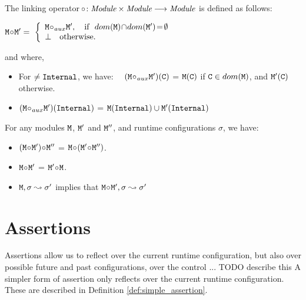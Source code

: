 \begin{definition}

The linking operator $\!\circ\!: {\mbox{\tt{{\it Module}}}} \times  {\mbox{\tt{{\it Module}}}} \longrightarrow {\mbox{\tt{{\it Module}}}}$ is defined as follows:

$
\M \link \M{'}  =\ \left\{
\begin{array}{l}
                        \M \link_{aux} \M{'},\ \ \   \hbox{if}\  \ dom(\M)\!\cap\!dom(\M')\!=\!\emptyset\\
\bot  \ \ \ \mbox{otherwise.}
\end{array}
                    \right.$
                    
and where,                  
\begin{itemize}
     \item 
   For $\neq{\mbox{\tt{Internal}}}$, we have: \ \
   $({\mbox{\tt{M}}} \!\circ\!_{aux} {\mbox{\tt{M}}}')({\mbox{\tt{C}}})$ = ${\mbox{\tt{M}}}({\mbox{\tt{C}}})$  if  ${\mbox{\tt{C}}}\in dom({\mbox{\tt{M}}})$, and  ${\mbox{\tt{M}}}'({\mbox{\tt{C}}})$ otherwise.
    \item  
   $({\mbox{\tt{M}}} \!\circ\!_{aux} {\mbox{\tt{M}}}')({\mbox{\tt{Internal}}})$ = $ {\mbox{\tt{M}}}({\mbox{\tt{Internal}}}) \cup  {\mbox{\tt{M}}}'({\mbox{\tt{Internal}}})$
 \end{itemize}
\end{definition}

 
 \begin{lemma}
 For any modules ${\mbox{\tt{M}}}$,   ${\mbox{\tt{M}}}'$ and ${\mbox{\tt{M}}}''$, and runtime configurations $\sigma$, we have$:$
 \label{lemma:linking:properties}
 
 \begin{itemize}
     \item 
     $({\mbox{\tt{M}}} \!\circ\! {\mbox{\tt{M}}}')\!\circ\! {\mbox{\tt{M}}}''$ = ${\mbox{\tt{M}}} \!\circ\! ({\mbox{\tt{M}}}' \!\circ\! {\mbox{\tt{M}}}'')$.
    \item  
      ${\mbox{\tt{M}}} \!\circ\! {\mbox{\tt{M}}}'$  = ${\mbox{\tt{M}}}' \!\circ\!{\mbox{\tt{M}}}$.
      \item
      ${\mbox{\tt{M}}}, \sigma \leadsto \sigma'$  implies that  ${\mbox{\tt{M}}}\!\circ\! {\mbox{\tt{M}}}', \sigma \leadsto \sigma'$
   \end{itemize}
 
 \end{lemma}
 
\section{ Assertions}

Assertions allow us to reflect over the current runtime configuration, but also over possible future and past configurations, over 
the control ... TODO describe this
A simpler form of assertion only reflects over the current runtime configuration. These are described in Definition \ref{def:simple_assertion}.
 
